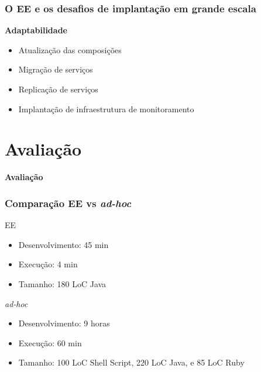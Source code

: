 \documentclass{beamer}
\newcommand\adhoc{\emph{ad-hoc}\xspace}
\newcommand\sectiontitle[1]{\begin{center}\huge\textbf{#1}\end{center}}
\newcommand\subtitulo[1]{{\large \textbf{#1}}}
\begin{document}

\begin{frame}
\frametitle{O EE e os desafios de implantação em grande escala}

\subtitulo{Adaptabilidade}

\begin{itemize}
\item Atualização das composições
\item Migração de serviços
\item Replicação de serviços
\item Implantação de infraestrutura de monitoramento
\end{itemize}

\end{frame}



\section{Avaliação}

\begin{frame}

\sectiontitle{Avaliação}

\end{frame}



\begin{frame}
\frametitle{Comparação EE vs \adhoc}

\begin{block}{EE}
\begin{itemize}
\item Desenvolvimento: 45 min
\item Execução: 4 min
\item Tamanho: 180 LoC Java
\end{itemize}
\end{block}

\vspace{0.6cm}

\begin{block}{\adhoc}
\begin{itemize}
\item Desenvolvimento: 9 horas
\item Execução: 60 min
\item Tamanho: 100 LoC Shell Script, 220 LoC Java, e 85 LoC Ruby
\end{itemize}
\end{block}

\end{frame}
\end{document}
